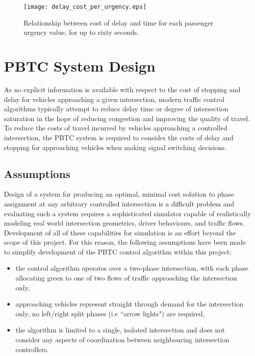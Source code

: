 
\begin{figure}[]
\centering
	\texttt{[image: delay\_cost\_per\_urgency.eps]}
	\caption{Relationship between cost of delay and time for each passenger urgency value, for up to sixty seconds. }
\label{delaycosturgency}
\end{figure}

\section{PBTC System Design}
 
As no explicit information is available with respect to the cost of stopping and delay for vehicles approaching a given intersection, modern traffic control algorithms typically attempt to reduce delay time or degree of intersection saturation in the hope of reducing congestion and improving the quality of travel. To reduce the costs of travel incurred by vehicles approaching a controlled intersection, the PBTC system is required to consider the costs of delay and stopping for approaching vehicles when making signal switching decisions.

\subsection{Assumptions}

Design of a system for producing an optimal, minimal cost solution to phase assignment at any arbitrary controlled intersection is a difficult problem and evaluating such a system requires a sophisticated simulator capable of realistically modeling real world intersection geometrics, driver behaviours, and traffic flows. Development of all of these capabilities for simulation is an effort beyond the scope of this project. For this reason, the following assumptions have been made to simplify development of the PBTC control algorithm within this project:

\begin{itemize}
\item the control algorithm operates over a two-phase intersection, with each phase allocating green to one of two flows of traffic approaching the intersection only,
\item approaching vehicles represent straight through demand for the intersection only, no left/right split phases (i.e ``arrow lights") are required,
\item the algorithm is limited to a single, isolated intersection and does not consider any aspects of coordination between neighbouring intersection controllers.
\end{itemize}

